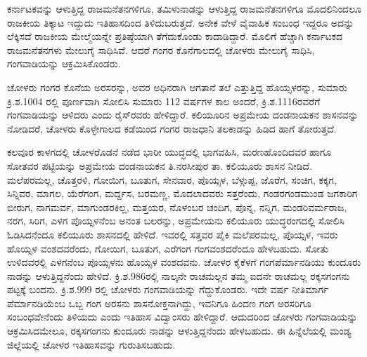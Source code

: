ಕರ್ನಾಟಕವನ್ನು ಆಳುತ್ತಿದ್ದ ರಾಜಮನೆತನಗಳಿಗೂ, ತಮಿಳುನಾಡನ್ನು ಆಳುತ್ತಿದ್ದ ರಾಜಮನೆತನಗಳಿಗೂ ಮೊದಲಿನಿಂದಲೂ ರಾಜಕೀಯ ತಿಕ್ಕಾಟ ಇದ್ದುದು ಇತಿಹಾಸದಿಂದ ತಿಳಿದುಬರುತ್ತದೆ. ಅನೇಕ ವೇಳೆ ವೈವಾಹಿಕ ಸಂಬಂಧ ಇದ್ದರೂ ಅದನ್ನು ಲೆಕ್ಕಿಸದೆ ರಾಜಕೀಯ ಮೇಲ್ಮೆಯನ್ನೇ ಪ್ರತಿಷ್ಠೆಯಾಗಿ ತೆಗೆದುಕೊಂಡು ಕಾದಾಡಿದ್ದಾರೆ. ಮೊಲಿಗೆ ಹೆಚ್ಚಾಗಿ ಕರ್ನಾಟಕದ ರಾಜಮನೆತನಗಳು ಮೇಲುಗೈ ಸಾಧಿಸಿವೆ. ಆದರೆ ಗಂಗರ ಕೊನೆಗಾಲದಲ್ಲಿ ಚೋಳರು ಮೇಲುಗೈ ಸಾಧಿಸಿ, ಗಂಗವಾಡಿಯನ್ನು ಆಕ್ರಮಿಸಿಕೊಂಡರು.

ಚೋಳರು ಗಂಗರ ಕೊನೆಯ ಅರಸರನ್ನು, ಅವರ ಅಧಿನರಾಗಿ ಆಗತಾನೆ ತಲೆ ಎತ್ತುತ್ತಿದ್ದ ಹೊಯ್ಸಳರನ್ನು, ಸುಮಾರು ಕ್ರಿ.ಶ.1004 ರಲ್ಲಿ ಪೂರ್ಣವಾಗಿ ಸೋಲಿಸಿ ಸುಮಾರು 112 ವರ್ಷಗಳ ಕಾಲ ಅಂದರೆ, ಕ್ರಿ.ಶ.1116ರವರೆಗೆ ಗಂಗವಾಡಿಯನ್ನು ಆಳಿದರು ಎಂದು ರೈಸ್​ರವರು ಹೇಳಿದ್ದಾರೆ. ಕಲಿಯೂರಿನ ಅಪ್ರಮೇಯ ದಂಡನಾಯಕನ ಶಾಸನವನ್ನು ನೋಡಿದರೆ, ಚೋಳರು ಕೊಳ್ಳೇಗಾಲದ ಕಡೆಯಿಂದ ಗಂಗರ ರಾಜಧಾನಿ ತಲಕಾಡನ್ನು ಹಿಡಿದ ಹಾಗೆ ತೋರುತ್ತದೆ.

ಕಲವೂರ ಕಾಳಗದಲ್ಲಿ ಚೋಳರೊಡನೆ ನಡೆದ ಭಾರೀ ಯುದ್ಧದಲ್ಲಿ ಭಾಗವಹಿಸಿ, ಮರಣಹೊಂದಿದವರ ಹಾಗೂ ಸೋತವರ ಪಟ್ಟಿಯನ್ನು ಅಪ್ರಮೇಯ ದಂಡನಾಯಕನ ತಿ.ನರಸೀಪುರ ತಾ. ಕಲಿಯೂರು ಶಾಸನ ನೀಡಿದೆ. ಮಲೆಪರಮಲ್ಲ, ಚೊತ್ತರಳಿ, ಗೋಯಿಗ, ಬೂತುಗ, ಸೇನವಾರ, ಪೊಯ್ಸಳ, ಬೆಳ್ಗುಪ್ಪ, ಜೊರೆಗ, ಸಂಚಿಗ, ಕಕ್ಕಗ, ಸಿನ್ನಿವರ, ಮಾಗಲ, ಯೆರೆಗಂಗ, ಮರ್ದ್ದಸ, ಬರಮಣ್ಣ, ಮೊದಲಾದವರು ಸತ್ತರೆಂದು, ಗಂಡರಗಂಡಮುಂಡ ಜಗಕಾರಿಗ ಬೀರುಗ, ನಾಗಮರ್ವ, ಮಾಗುಂಡರಕಿಲ್ಲ, ಮತ್ತಯರ, ನೊಳಂಬರ ಚಂದಿಗ, ಪೊನ್ನ, ನನ್ನಿಗ, ಮಂಡರಿವರ್ಮರಾಜ, ನರಗ, ಸಿರಿಗ, ಎಳಗ ಪೊಯ್ಸಳನೆಂಬ ಅನಂತ ಬಲರನ್ನು, ಅಪ್ರಮೇಯನು ಕಲಿಯೂರು ಯುದ್ಧರಂಗದಲ್ಲಿ ಸೋಲಿಸಿ ಓಡಿಸಿದನೆಂದೂ ಕಲಿಯೂರು ಶಾಸನದಲ್ಲಿ ಹೇಳಿದೆ. ಇವರಲ್ಲಿ ಸತ್ತವರ ಪೈಕಿ ಮಲೆಪರಮಲ್ಲ, ಪೊಯ್ಸಳ, ಇವರು ಹೊಯ್ಸಳ ವಂಶದವರೆಂದು, ಗೋಯಿಗ, ಬೂತುಗ, ಎರೆಗಂಗ ಗಂಗವಂಶದರೆಂದೂ ಹೇಳಬಹುದು. ಸೋತು ಉಳಿದವರಲ್ಲಿ ಎಳಗನೆಂಬ ಪೊಯ್ಸಳನು ಹೊಯ್ಸಳ ವಂಶದವನು. ಚೋಳರ ಕೈಕೆಳಗೆ ಗಂಗಪೆರ್ಮಾನಡಿಯು ಕುಂದೂರು ನಾಡನ್ನು ಆಳುತ್ತಿದ್ದನೆಂದು ಹೇಳಿದೆ. ಕ್ರಿ.ಶ.986ರಲ್ಲಿ ನಾಲ್ಕನೇ ರಾಚಮಲ್ಲನ ತಮ್ಮ ಐದನೇ ರಾಚಮಲ್ಲ ರಕ್ಕಸಗಂಗನು ಪಟ್ಟಕ್ಕೆ ಬಂದನು. ಕ್ರಿ.ಶ.999 ರಲ್ಲಿ ಚೋಳರು ಗಂಗವಾಡಿಯನ್ನು ಗೆದ್ದುಕೊಂಡರು. ಇದೇ ವರ್ಷ ನೀತಿಮಾರ್ಗ ಪೆರ್ಮಾನಡಿಯೆಂಬ ಒಬ್ಬ ಗಂಗ ಅರಸನು ಶಾಸನೋಕ್ತನಾಗಿದ್ದು, ಇವನಿಗೂ ಹಿಂದಣ ಗಂಗ ಅರಸರಿಗೂ ಸಂಬಂಧವೇನೆಂದು ತಿಳಿಯದು ಎಂದು ಇತಿಹಾಸ ವಿದ್ವಾಂಸರು ಹೇಳಿದ್ದಾರೆ. ಆದುದರಿಂದ ಚೋಳರು ಗಂಗವಾಡಿಯನ್ನು ಆಕ್ರಮಿಸಿದಮೇಲೂ, ರಕ್ಕಸಗಂಗನು ಕುಂದೂರು ನಾಡನ್ನು ಆಳುತ್ತಿದ್ದನೆಂದು ಹೇಳಬಹುದು. ಈ ಹಿನ್ನೆಲೆಯಲ್ಲಿ ಮಂಡ್ಯ ಜಿಲ್ಲೆಯಲ್ಲಿ ಚೋಳರ ಇತಿಹಾಸವನ್ನು ಗುರುತಿಸಬಹುದು.

